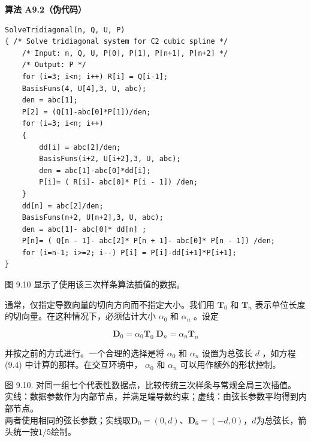 \documentclass[../main.tex]{subfiles}
\begin{document}
\par\medskip\noindent\textbf{算法 A9.2（伪代码）}\par
\begin{verbatim}
SolveTridiagonal(n, Q, U, P)
{ /* Solve tridiagonal system for C2 cubic spline */
    /* Input: n, Q, U, P[0], P[1], P[n+1], P[n+2] */
    /* Output: P */
    for (i=3; i<n; i++) R[i] = Q[i-1];
    BasisFuns(4, U[4],3, U, abc);
    den = abc[1];
    P[2] = (Q[1]-abc[0]*P[1])/den;
    for (i=3; i<n; i++)
    {
        dd[i] = abc[2]/den;
        BasisFuns(i+2, U[i+2],3, U, abc);
        den = abc[1]-abc[0]*dd[i];
        P[i]= ( R[i]- abc[0]* P[i - 1]) /den;
    }
    dd[n] = abc[2]/den;
    BasisFuns(n+2, U[n+2],3, U, abc);
    den = abc[1]- abc[0]* dd[n] ;
    P[n]= ( Q[n - 1]- abc[2]* P[n + 1]- abc[0]* P[n - 1]) /den;
    for (i=n-1; i>=2; i--) P[i] = P[i]-dd[i+1]*P[i+1];
}
\end{verbatim}

图 9.10 显示了使用该三次样条算法插值的数据。

通常，仅指定导数向量的切向方向而不指定大小。我们用 \({\mathbf{T}}_{0}\) 和 \({\mathbf{T}}_{n}\) 表示单位长度的切向量。在这种情况下，必须估计大小 \({\alpha }_{0}\) 和 \({\alpha }_{n}\) 。设定

\[
{\mathbf{D}}_{0} = {\alpha }_{0}{\mathbf{T}}_{0}\;{\mathbf{D}}_{n} = {\alpha }_{n}{\mathbf{T}}_{n} \tag{9.18}
\]

并按之前的方式进行。一个合理的选择是将 \({\alpha }_{0}\) 和 \({\alpha }_{n}\) 设置为总弦长 \(d\) ，如方程 (9.4) 中计算的那样。在交互环境中， \({\alpha }_{0}\) 和 \({\alpha }_{n}\) 可以用作额外的形状控制。



\begin{center}
\begin{minipage}{27cm}
\vspace*{.6\baselineskip}
\centering
{}
\par\smallskip
图 9.10. 对同一组七个代表性数据点，比较传统三次样条与常规全局三次插值。\\
实线：数据参数作为内部节点，并满足端导数约束；虚线：由弦长参数平均得到内部节点。\\
两者使用相同的弦长参数；实线取$\mathbf D_0=(0,d)$、$\mathbf D_6=(-d,0)$，$d$为总弦长，箭头统一按$1/5$绘制。
\end{minipage}
\end{center}
\end{document}
